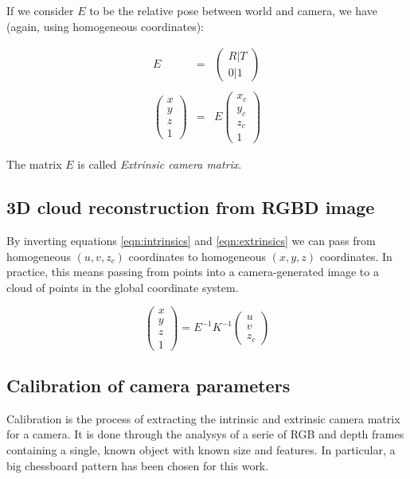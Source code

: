 If we consider $E$ to be the relative pose between world and camera, we have
(again, using homogeneous coordinates):

\begin{eqnarray}
  E&=&\left(
  \begin{array}{c}
  R | T \\
  0 | 1
\end{array}
\right) \\ 
\nonumber \\
\left(\begin{array}{c}x\\y\\z\\1\end{array}\right)
  &=&
  E
\left(\begin{array}{c}x_c\\y_c\\z_c\\1\end{array}\right) \label{eqn:extrinsics}
\end{eqnarray}

The matrix $E$ is called \emph{Extrinsic camera matrix}.

\subsection{3D cloud reconstruction from RGBD image}
By inverting equations \ref{eqn:intrinsics} and \ref{eqn:extrinsics} we can pass from homogeneous
$(u,v,z_c)$ coordinates to homogeneous $(x,y,z)$ coordinates. In practice, this
means passing from points into a camera-generated image to a cloud of points in
the global coordinate system.

\begin{equation}
  \left(\begin{array}{c}x\\y\\z\\1\end{array}\right)
  =E^{-1}K^{-1}\left(\begin{array}{c}u\\v\\z_c\end{array}\right)
\end{equation}

\subsection{Calibration of camera parameters}
Calibration is the process of extracting the intrinsic and extrinsic
camera matrix for a camera. It is done through the analysys of a serie of RGB and depth
frames containing a single, known object with known size and features. In
particular, a big chessboard pattern has been chosen for this work.

